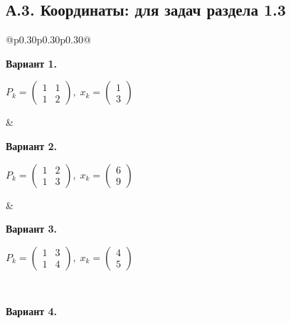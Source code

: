 \documentclass[12pt,a4paper]{article}
\begin{document}
\subsection*{А.3. Координаты: для задач раздела 1.3}
{\small
\begin{longtable}{@{}p{0.30\textwidth}p{0.30\textwidth}p{0.30\textwidth}@{}}
\begin{minipage}[t]{\linewidth}\vspace{0pt}\raggedright\setlength{\parskip}{0pt}
\textbf{Вариант 1.}\par\smallskip
\(\displaystyle  P_k=\begin{pmatrix}1&1\\1&2\end{pmatrix},\; x_k=\begin{pmatrix}1\\3\end{pmatrix}\)\par
\end{minipage} &
\begin{minipage}[t]{\linewidth}\vspace{0pt}\raggedright\setlength{\parskip}{0pt}
\textbf{Вариант 2.}\par\smallskip
\(\displaystyle  P_k=\begin{pmatrix}1&2\\1&3\end{pmatrix},\; x_k=\begin{pmatrix}6\\9\end{pmatrix}\)\par
\end{minipage} &
\begin{minipage}[t]{\linewidth}\vspace{0pt}\raggedright\setlength{\parskip}{0pt}
\textbf{Вариант 3.}\par\smallskip
\(\displaystyle  P_k=\begin{pmatrix}1&3\\1&4\end{pmatrix},\; x_k=\begin{pmatrix}4\\5\end{pmatrix}\)\par
\end{minipage}\\\noalign{\vskip 14pt}
\begin{minipage}[t]{\linewidth}\vspace{0pt}\raggedright\setlength{\parskip}{0pt}
\textbf{Вариант 4.}\par\smallskip

\end{minipage}
\end{longtable}}
\end{document}
